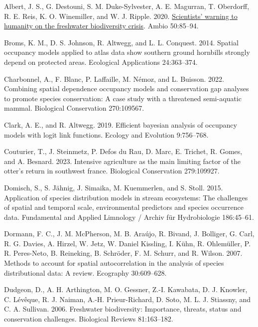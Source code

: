 \documentclass[
  11pt,
  a4paper,
]{article}
\newlength{\cslhangindent}
\newenvironment{CSLReferences}[2] %
 {\begin{list}{}{%
  \setlength{\itemindent}{0pt}
  \setlength{\leftmargin}{0pt}
  \setlength{\parsep}{0pt}
  \ifodd #1
   \setlength{\leftmargin}{\cslhangindent}
   \setlength{\itemindent}{-1\cslhangindent}
  \fi
  \setlength{\itemsep}{#2\baselineskip}}}
 {\end{list}}
\begin{document}
\label{refs}
\begin{CSLReferences}{1}{0}
Albert, J. S., G. Destouni, S. M. Duke-Sylvester, A. E. Magurran, T. Oberdorff, R. E. Reis, K. O. Winemiller, and W. J. Ripple. 2020. \href{https://api.semanticscholar.org/CorpusID:211074855}{Scientists' warning to humanity on the freshwater biodiversity crisis}. Ambio 50:85--94.

Broms, K. M., D. S. Johnson, R. Altwegg, and L. L. Conquest. 2014. Spatial occupancy models applied to atlas data show southern ground hornbills strongly depend on protected areas. Ecological Applications 24:363--374.

Charbonnel, A., F. Blanc, P. Laffaille, M. Némoz, and L. Buisson. 2022. Combining spatial dependence occupancy models and conservation gap analyses to promote species conservation: A case study with a threatened semi-aquatic mammal. Biological Conservation 270:109567.

Clark, A. E., and R. Altwegg. 2019. Efficient bayesian analysis of occupancy models with logit link functions. Ecology and Evolution 9:756--768.

Couturier, T., J. Steinmetz, P. Defos du Rau, D. Marc, E. Trichet, R. Gomes, and A. Besnard. 2023. Intensive agriculture as the main limiting factor of the otter's return in southwest france. Biological Conservation 279:109927.

Domisch, S., S. Jähnig, J. Simaika, M. Kuemmerlen, and S. Stoll. 2015. Application of species distribution models in stream ecosystems: The challenges of spatial and temporal scale, environmental predictors and species occurrence data. Fundamental and Applied Limnology / Archiv f{ü}r Hydrobiologie 186:45--61.

Dormann, F. C., J. M. McPherson, M. B. Araújo, R. Bivand, J. Bolliger, G. Carl, R. G. Davies, A. Hirzel, W. Jetz, W. Daniel Kissling, I. Kühn, R. Ohlemüller, P. R. Peres-Neto, B. Reineking, B. Schröder, F. M. Schurr, and R. Wilson. 2007. Methods to account for spatial autocorrelation in the analysis of species distributional data: A review. Ecography 30:609--628.

Dudgeon, D., A. H. Arthington, M. O. Gessner, Z.-I. Kawabata, D. J. Knowler, C. Lévêque, R. J. Naiman, A.-H. Prieur-Richard, D. Soto, M. L. J. Stiassny, and C. A. Sullivan. 2006. Freshwater biodiversity: Importance, threats, status and conservation challenges. Biological Reviews 81:163--182.


\end{CSLReferences}
\end{document}
